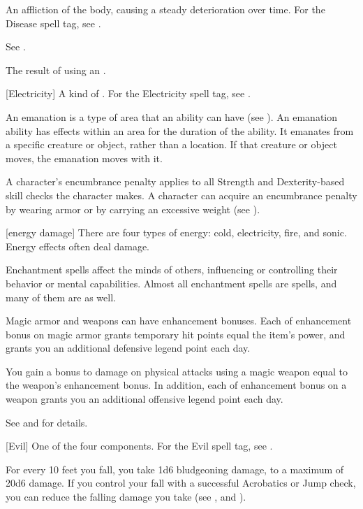  An affliction of the body, causing a steady deterioration over time. For the Disease spell tag, see .

 See .

 The result of using an .

[Electricity] A kind of . For the Electricity spell tag, see .

 An emanation is a type of area that an ability can have (see ).
An emanation ability has effects within an area for the duration of the ability.
It emanates from a specific creature or object, rather than a location.
If that creature or object moves, the emanation moves with it.

 A character's encumbrance penalty applies to all Strength and Dexterity-based skill checks the character makes.
A character can acquire an encumbrance penalty by wearing armor or by carrying an excessive weight (see ).

[energy damage] There are four types of energy: cold, electricity, fire, and sonic. Energy effects often deal damage.

 Enchantment spells affect the minds of others, influencing or controlling their behavior or mental capabilities. Almost all enchantment spells are  spells, and many of them are  as well.

 Magic armor and weapons can have enhancement bonuses.
Each  of enhancement bonus on magic armor grants temporary hit points equal the item's power, and grants you an additional defensive legend point each day.

You gain a bonus to damage on physical attacks using a magic weapon equal to the weapon's enhancement bonus.
In addition, each  of enhancement bonus on a weapon grants you an additional offensive legend point each day.

See  and  for details.

[Evil] One of the four  components. For the Evil spell tag, see .

 For every 10 feet you fall, you take 1d6 bludgeoning damage, to a maximum of 20d6 damage.
If you control your fall with a successful Acrobatics or Jump check, you can reduce the falling damage you take (see , and ).


